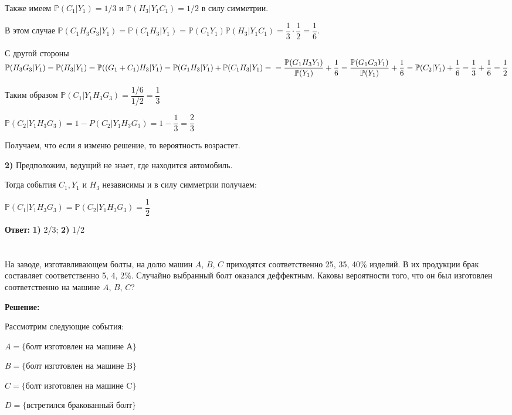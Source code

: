 \documentclass[a4paper,12pt]{article}
\newcommand{\bb}{\mathbb}
\begin{document}
Также имеем $\bb P(C_1|Y_1) = 1/3$ и $\bb P(H_3|Y_1C_1) = 1/2$ в силу симметрии.

В этом случае $\bb P(C_1H_3G_3|Y_1) = \bb P(C_1H_3|Y_1) = \bb P(C_1 Y_1) \bb P(H_3|Y_1C_1) = \dfrac{1}{3}\cdot\dfrac{1}{2} = \dfrac{1}{6}$.

С другой стороны $\bb P(H_3G_3|Y_1) = \bb P(H_3|Y_1) = \bb P((G_1 + C_1)H_3|Y_1) = \bb P(G_1H_3|Y_1) + \bb P(C_1H_3|Y_1)=\\=\dfrac{\bb P(G_1H_3Y_1)}{\bb P(Y_1)} + \dfrac{1}{6} = \dfrac{\bb P(G_1G_3Y_1)}{\bb P(Y_1)} + \dfrac{1}{6} = \bb P(C_2|Y_1)+\dfrac{1}{6} = \dfrac{1}{3}+\dfrac{1}{6} = \dfrac{1}{2}$

Таким образом $\bb P(C_1|Y_1H_3G_3) = \dfrac{1/6}{1/2} = \dfrac{1}{3}$

$\bb P(C_2|Y_1H_3G_3) = 1 - P(C_2|Y_1H_3G_3) = 1 - \dfrac{1}{3} = \dfrac{2}{3}$

Получаем, что если я изменю решение, то вероятность возрастет.

\vspace{\baselineskip}

\textbf{2)} Предположим, ведущий не знает, где находится автомобиль.

Тогда события $C_1, Y_1 $ и $H_3$ независимы и в силу симметрии получаем:

$\bb P(C_1|Y_1H_3G_3) = \bb P(C_2|Y_1H_3G_3) = \dfrac{1}{2}$

\textbf{Ответ:} \textbf{1)} 2/3; \textbf{2)} 1/2

\section{}
На заводе, изготавливающем болты, на долю машин $A$, $B$, $C$ приходятся соответственно 25, 35, 40\% изделий. В их продукции брак составляет соответственно
5, 4, 2\%. Случайно выбранный болт оказался деффектным. Каковы вероятности
того, что он был изготовлен соответственно на машине $A$, $B$, $C$?

\vspace{\baselineskip}

\textbf{Решение:}

Рассмотрим следующие события:

$A = \{\text{болт изготовлен на машине А}\}$

$B =\{\text{болт изготовлен на машине B}\}$

$C = \{\text{болт изготовлен на машине C}\}$

$D = \{\text{встретился бракованный болт}\}$
\end{document}
